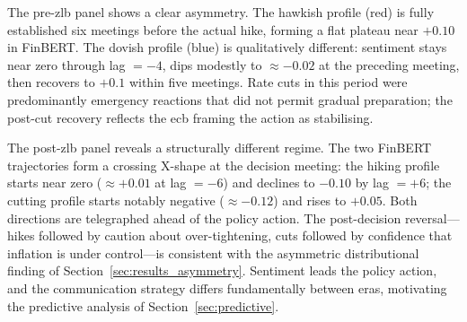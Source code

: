 The pre-\gls{zlb} panel shows a clear asymmetry. The hawkish profile (red) is fully established six meetings before the actual hike, forming a flat plateau near $+0.10$ in FinBERT. The dovish profile (blue) is qualitatively different: sentiment stays near zero through lag $= -4$, dips modestly to $\approx -0.02$ at the preceding meeting, then recovers to $+0.1$ within five meetings. Rate cuts in this period were predominantly emergency reactions that did not permit gradual preparation; the post-cut recovery reflects the \gls{ecb} framing the action as stabilising.

The post-\gls{zlb} panel reveals a structurally different regime. The two FinBERT trajectories form a crossing X-shape at the decision meeting: the hiking profile starts near zero ($\approx +0.01$ at lag $= -6$) and declines to $-0.10$ by lag $= +6$; the cutting profile starts notably negative ($\approx -0.12$) and rises to $+0.05$. Both directions are telegraphed ahead of the policy action. The post-decision reversal---hikes followed by caution about over-tightening, cuts followed by confidence that inflation is under control---is consistent with the asymmetric distributional finding of Section~\ref{sec:results_asymmetry}. Sentiment leads the policy action, and the communication strategy differs fundamentally between eras, motivating the predictive analysis of Section~\ref{sec:predictive}.